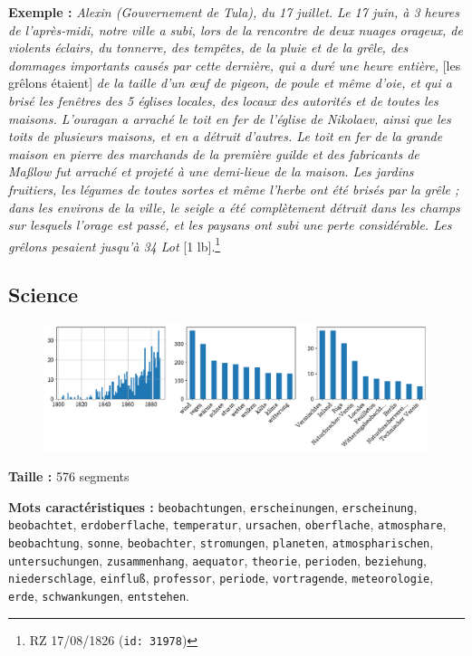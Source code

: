 \documentclass[a4paper,twoside,12pt]{article}
\begin{document}
\noindent \textbf{Exemple :} \textit{Alexin (Gouvernement de Tula), du 17 juillet. Le 17 juin, à 3 heures de l'après-midi, notre ville a subi, lors de la rencontre de deux nuages orageux, de violents éclairs, du tonnerre, des tempêtes, de la pluie et de la grêle, des dommages importants causés par cette dernière, qui a duré une heure entière,} [les grêlons étaient] \textit{de la taille d'un œuf de pigeon, de poule et même d'oie, et qui a brisé les fenêtres des 5 églises locales, des locaux des autorités et de toutes les maisons. L'ouragan a arraché le toit en fer de l'église de Nikolaev, ainsi que les toits de plusieurs maisons, et en a détruit d'autres. Le toit en fer de la grande maison en pierre des marchands de la première guilde et des fabricants de Maßlow fut arraché et projeté à une demi-lieue de la maison. Les jardins fruitiers, les légumes de toutes sortes et même l'herbe ont été brisés par la grêle ; dans les environs de la ville, le seigle a été complètement détruit dans les champs sur lesquels l'orage est passé, et les paysans ont subi une perte considérable. Les grêlons pesaient jusqu'à 34 Lot} [1 lb].\footnote{RZ 17/08/1826 (\texttt{id: 31978})}

\clearpage


\subsection{Science} \label{topic13_science}

\begin{figure}[H]
\centering
\includegraphics[width=\textwidth]{images/topic_charts_13.pdf}
\end{figure}

\begin{flushleft}
\textbf{Taille :} 576 segments

\textbf{Mots caractéristiques :} \texttt{beobachtungen}, \texttt{erscheinungen}, \texttt{erscheinung}, \texttt{beobachtet}, \texttt{erdoberflache}, \texttt{temperatur}, \texttt{ursachen}, \texttt{oberflache}, \texttt{atmosphare}, \texttt{beobachtung}, \texttt{sonne}, \texttt{beobachter}, \texttt{stromungen}, \texttt{planeten}, \texttt{atmospharischen}, \texttt{untersuchungen}, \texttt{zusammenhang}, \texttt{aequator}, \texttt{theorie}, \texttt{perioden}, \texttt{beziehung}, \texttt{niederschlage}, \texttt{einfluß}, \texttt{professor}, \texttt{periode}, \texttt{vortragende}, \texttt{meteorologie}, \texttt{erde}, \texttt{schwankungen}, \texttt{entstehen}.
\end{flushleft}
\end{document}
